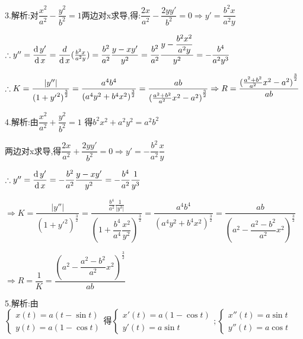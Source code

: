 3.解析:对$\dfrac{{{x^2}}}{{{a^2}}} - \dfrac{{{y^2}}}{{{b^2}}} = 1$两边对x求导,得:$\dfrac{{2x}}{{{a^2}}} - \dfrac{{2yy'}}{{{b^2}}} = 0 \Rightarrow y' = \dfrac{{{b^2}x}}{{{a^2}y}}$

$\therefore y'' = \dfrac{{\operatorname{\mathop{}\!\mathrm{d}} y'}}{{\operatorname{\mathop{}\!\mathrm{d}} x}} = \dfrac{d}{{\operatorname{\mathop{}\!\mathrm{d}} x}}(\frac{{{b^2}x}}{{{a^2}y}}) = \dfrac{{{b^2}}}{{{a^2}}}\dfrac{{y - xy'}}{{{y^2}}} = \dfrac{{{b^2}}}{{{a^2}}}\dfrac{{y - \dfrac{{{b^2}{x^2}}}{{{a^2}y}}}}{{{y^2}}} =  - \dfrac{{{b^4}}}{{{a^2}{y^3}}}$

$
\therefore K = \dfrac{\left| y'' \right|}{{{{(1 + {{y'}^2})}^{\frac{3}{2}}}}}
= \dfrac{{{a^4}{b^4}}}{{{{({a^4}{y^2} + {b^4}{x^2})}^{\frac{3}{2}}}}}
= \dfrac{{ab}}{{{{(\frac{{{a^2} + {b^2}}}{{{a^2}}}{x^2} - {a^2})}^{\frac{3}{2}}}}}
\Rightarrow R = \dfrac{{{{(\frac{{{a^2} + {b^2}}}{{{a^2}}}{x^2} - {a^2})}^{\frac{3}{2}}}}}{{ab}}
$

4.解析:由$\dfrac{{{x^2}}}{{{a^2}}} + \dfrac{{{y^2}}}{{{b^2}}} = 1$
得${b^2}{x^2} + {a^2}{y^2} = {a^2}{b^2}$

两边对x求导,得$\dfrac{{2x}}{{{a^2}}} + \dfrac{{2yy'}}{{{b^2}}} = 0 \Rightarrow y' =  - \dfrac{{{b^2}}}{{{a^2}}}\dfrac{x}{y}$

$\therefore y'' = \dfrac{{\operatorname{\mathop{}\!\mathrm{d}} y'}}{{\operatorname{\mathop{}\!\mathrm{d}} x}} =  - \dfrac{{{b^2}}}{{{a^2}}}\dfrac{{y - xy'}}{{{y^2}}} =  - \dfrac{{{b^4}}}{{{a^2}}}\dfrac{1}{{{y^3}}}$

$ \Rightarrow K = \dfrac{{|y''|}}{{{{(1 + {{y'}^2})}^{\frac{3}{2}}}}} = \dfrac{{\frac{{{b^4}}}{{{a^2}}}\frac{1}{{|{y^3}|}}}}{{{{(1 + \dfrac{{{b^4}}}{{{a^4}}}\dfrac{{{x^2}}}{{{y^2}}})}^{\frac{3}{2}}}}} = \dfrac{{{a^4}{b^4}}}{{{{({a^4}{y^2} + {b^4}{x^2})}^{\frac{3}{2}}}}} = \dfrac{{ab}}{{{{({a^2} - \dfrac{{{a^2} - {b^2}}}{{{a^2}}}{x^2})}^{\frac{3}{2}}}}}$

$ \Rightarrow R = \dfrac{1}{K} = \dfrac{{{{({a^2} - \dfrac{{{a^2} - {b^2}}}{{{a^2}}}{x^2})}^{\frac{3}{2}}}}}{{ab}}$

5.解析:由$\left\{ \begin{array}{l}
x(t) = a(t - \sin t)\\
y(t) = a(1 - \cos t)
\end{array} \right.得\left\{ \begin{array}{l}
x'(t) = a(1 - \cos t)\\
y'(t) = a\sin t
\end{array} \right.;\left\{ \begin{array}{l}
x''(t) = a\sin t\\
y''(t) = a\cos t
\end{array} \right.$

